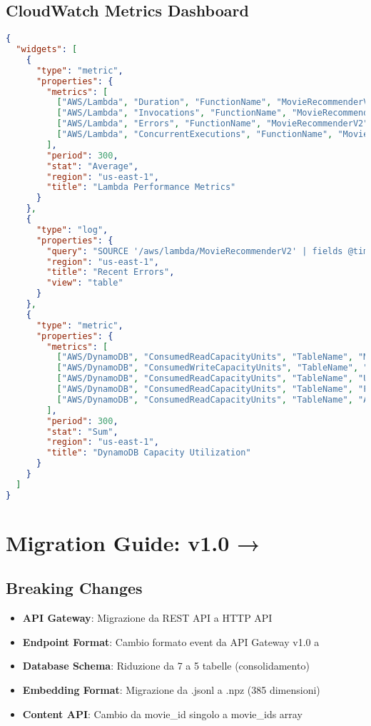 \documentclass[11pt,a4paper]{article}
\begin{document}
\subsection{CloudWatch Metrics Dashboard}
\begin{lstlisting}[language=JSON, caption=CloudWatch Dashboard Configuration]
{
  "widgets": [
    {
      "type": "metric",
      "properties": {
        "metrics": [
          ["AWS/Lambda", "Duration", "FunctionName", "MovieRecommenderV2"],
          ["AWS/Lambda", "Invocations", "FunctionName", "MovieRecommenderV2"],
          ["AWS/Lambda", "Errors", "FunctionName", "MovieRecommenderV2"],
          ["AWS/Lambda", "ConcurrentExecutions", "FunctionName", "MovieRecommenderV2"]
        ],
        "period": 300,
        "stat": "Average",
        "region": "us-east-1",
        "title": "Lambda Performance Metrics"
      }
    },
    {
      "type": "log",
      "properties": {
        "query": "SOURCE '/aws/lambda/MovieRecommenderV2' | fields @timestamp, @message\n| filter @message like /ERROR/\n| sort @timestamp desc\n| limit 20",
        "region": "us-east-1",
        "title": "Recent Errors",
        "view": "table"
      }
    },
    {
      "type": "metric",
      "properties": {
        "metrics": [
          ["AWS/DynamoDB", "ConsumedReadCapacityUnits", "TableName", "Movies"],
          ["AWS/DynamoDB", "ConsumedWriteCapacityUnits", "TableName", "Reviews"],
          ["AWS/DynamoDB", "ConsumedReadCapacityUnits", "TableName", "Users"],
          ["AWS/DynamoDB", "ConsumedReadCapacityUnits", "TableName", "Favorites"],
          ["AWS/DynamoDB", "ConsumedReadCapacityUnits", "TableName", "Activity"]
        ],
        "period": 300,
        "stat": "Sum",
        "region": "us-east-1",
        "title": "DynamoDB Capacity Utilization"
      }
    }
  ]
}
\end{lstlisting}

\section{Migration Guide: v1.0 →}

\subsection{Breaking Changes}
\begin{itemize}
  \item \textbf{API Gateway}: Migrazione da REST API a HTTP API
  \item \textbf{Endpoint Format}: Cambio formato event da API Gateway v1.0 a
  \item \textbf{Database Schema}: Riduzione da 7 a 5 tabelle (consolidamento)
  \item \textbf{Embedding Format}: Migrazione da .jsonl a .npz (385 dimensioni)
  \item \textbf{Content API}: Cambio da movie\_id singolo a movie\_ids array
\end{itemize}
\end{document}
